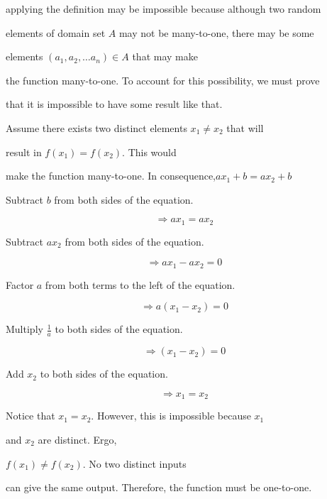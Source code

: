 applying the definition may be impossible because although two random

elements of domain set $A$ may not be many-to-one, there may be some

elements $\left( a_{1},a_{2},\ldots a_{n} \right)\in A$ that may make

the function many-to-one. To account for this possibility, we must prove

that it is impossible to have some result like that.



Assume there exists two distinct elements $x_{1}\ne x_2$ that will

result in $f\left( x_{1} \right) =f\left( x_{2} \right)$. This would

make the function many-to-one. In consequence,$ax_{1}+b=ax_{2}+b$



Subtract $b$ from both sides of the equation.



$$\Rightarrow ax_{1}=ax_{2}$$



Subtract $ax_{2}$ from both sides of the equation.



$$\Rightarrow ax_{1}-ax_{2}=0$$



Factor $a$ from both terms to the left of the equation.



$$\Rightarrow a\left( x_{1}-x_{2} \right) =0$$



Multiply $\frac{1}{a}$ to both sides of the equation.



$$\Rightarrow \left( x_{1}-x_{2} \right) =0$$



Add $x_{2}$ to both sides of the equation.



$$\Rightarrow x_{1}=x_{2}$$



Notice that $x_{1}=x_{2}$. However, this is impossible because $x_{1}$

and $x_{2}$ are distinct. Ergo,

$f\left( x_{1} \right)\ne f\left( x_{2} \right)$. No two distinct inputs

can give the same output. Therefore, the function must be one-to-one.



